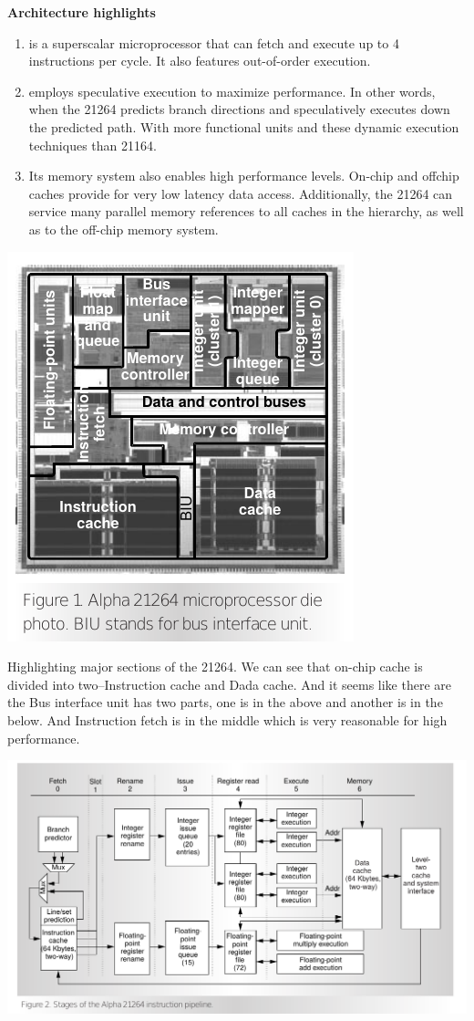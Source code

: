 \documentclass[11pt]{article}
\begin{document}
\textbf{Architecture highlights}
\begin{enumerate}
	\item is a superscalar microprocessor that can fetch and execute up to 4 instructions per cycle. It also features out-of-order execution.
	\item employs speculative execution to maximize performance. In other words, when the 21264 predicts branch directions and speculatively executes down the predicted path. With more functional units and these dynamic execution techniques than 21164.
	\item Its memory system also enables high performance levels. On-chip and offchip caches provide for very low latency data access. Additionally, the 21264 can service many parallel memory references to all caches in the hierarchy, as well as to the off-chip memory system.
\end{enumerate}
\begin{center}
	\includegraphics[scale=0.5]{overview.png}
\end{center}
Highlighting major sections of the 21264. We can see that on-chip cache is divided into two--Instruction cache and Dada cache. And it seems like there are the Bus interface unit has two parts, one is in the above and another is in the below. And Instruction fetch is in the middle which is very reasonable for high performance.
\begin{center}
	\includegraphics[width=\linewidth]{pipeline.png}
\end{center}
\end{document}
